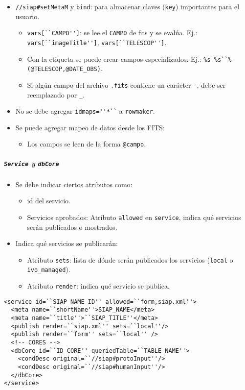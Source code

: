 \begin{itemize}
	\item \verb;//siap#setMetaM; y \verb;bind;: para almacenar claves (\verb;key;) importantes para el usuario.
		\begin{itemize}
			\item \verb;vars[``CAMPO''];: se lee el \verb;CAMPO; de fits y se evalúa. Ej.: \verb;vars[``imageTitle''];, \verb;vars[``TELESCOP''];.
			\item Con la etiqueta se puede crear campos especializados. Ej.: \verb;%s %s``%(@TELESCOP,@DATE_OBS);.
			\item Si algún campo del archivo \verb;.fits; contiene un carácter \verb;-;, debe ser reemplazado por \verb;_;.
		\end{itemize}
	\item No se debe agregar \verb;idmaps=''*``; a \verb;rowmaker;.
	\item Se puede agregar mapeo de datos desde los FITS:
		\begin{itemize}
			\item Los campos se leen de la forma \verb;@campo;.
		\end{itemize}
\end{itemize}

\subparagraph{\texttt{Service} y \texttt{dbCore}}

\begin{itemize}
	\item Se debe indicar ciertos atributos como:
		\begin{itemize}
			\item id del servicio.
			\item Servicios aprobados: Atributo \verb;allowed; en \verb;service;, indica qu\'e servicios serán publicados o mostrados.
		\end{itemize}
	\item Indica qu\'e  servicios se publicarán:
		\begin{itemize}
			\item Atributo \verb;sets;: lista de dónde serán publicados los servicios (\verb;local; o \verb;ivo_managed;).
			\item Atributo \verb;render;: indica qu\'e servicio se publica.
		\end{itemize}
\end{itemize}

\begin{verbatim}
<service id=``SIAP_NAME_ID'' allowed=``form,siap.xml''>
  <meta name=``shortName''>SIAP_NAME</meta>
  <meta name=``title''>``SIAP_TITLE''</meta>
  <publish render=``siap.xml'' sets=``local''/>
  <publish render=``form'' sets=``local'' />
  <!-- CORES -->
  <dbCore id=``ID_CORE'' queriedTable=``TABLE_NAME''>
    <condDesc original=``//siap#protoInput''/>
    <condDesc original=``//siap#humanInput''/>
  </dbCore>
</service>
\end{verbatim}

